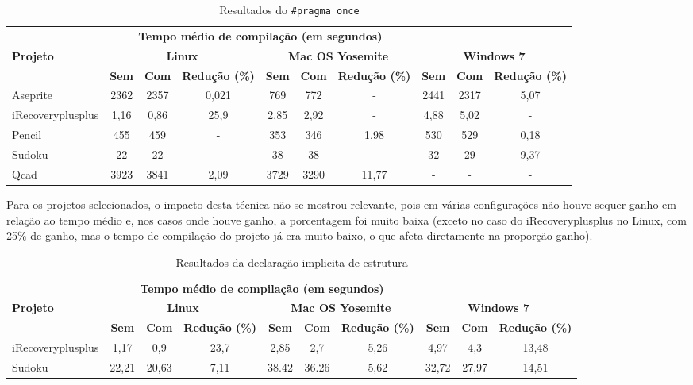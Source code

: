 \begin{table}[!ht]
\tiny
\centering
\caption{Resultados do \texttt{\#pragma once}}
\label{tab:pragma}
\begin{tabular}{lccccccccc}
& \multicolumn{6}{c}{\textbf{Tempo médio de compilação (em segundos)} } \\
\textbf{Projeto} & \multicolumn{3}{c}{\textbf{Linux}} & \multicolumn{3}{c}{\textbf{Mac OS Yosemite}} & \multicolumn{3}{c}{\textbf{Windows 7}} \\ 
& \textbf{Sem } & \textbf{Com }  & \textbf{Redução (\%)} & \textbf{Sem } & \textbf{Com }  & \textbf{Redução (\%)} & \textbf{Sem } & \textbf{Com }  & \textbf{Redução (\%)} \\
\toprule
Aseprite & 2362 &  2357 & 0,021     & 769  & 772 &   - &  2441 & 2317 & 5,07 \\
iRecoveryplusplus & 1,16 & 0,86     & 25,9 & 2,85 & 2,92 & - & 4,88     & 5,02 & - \\
Pencil & 455  &  459  &  - &  353   & 346  & 1,98 &  530      & 529 &  0,18 \\
Sudoku & 22   &  22   &  - &  38    & 38   & -  &  32 & 29 & 9,37 \\ 
Qcad   & 3923 &  3841 &  2,09  &  3729  & 3290 & 11,77   & - & -  & - \\ 
\end{tabular}
\end{table}

Para os projetos selecionados, o impacto desta técnica não se mostrou relevante, pois em várias configurações não houve sequer ganho em relação ao tempo médio e, nos casos onde
houve ganho, a porcentagem foi muito baixa (exceto no caso do iRecoveryplusplus no Linux, com 25\% de ganho, mas o tempo de compilação do projeto já era muito baixo, o que afeta diretamente na proporção ganho).

\begin{table}[!ht]
\tiny
\centering
\caption{Resultados da declaração implicita de estrutura}
\label{tab:forward_declaration}
\begin{tabular}{lccccccccc}
& \multicolumn{6}{c}{\textbf{Tempo médio de compilação (em segundos)} } \\
\textbf{Projeto} & \multicolumn{3}{c}{\textbf{Linux}} & \multicolumn{3}{c}{\textbf{Mac OS Yosemite}} & \multicolumn{3}{c}{\textbf{Windows 7}} \\ 
& \textbf{Sem } & \textbf{Com }  & \textbf{Redução (\%)} & \textbf{Sem } & \textbf{Com }  & \textbf{Redução (\%)} & \textbf{Sem } & \textbf{Com }  & \textbf{Redução (\%)} \\
\toprule
iRecoveryplusplus &   1,17  &   0,9  & 23,7 &   2,85 &  2,7 & 5,26 &  4,97 & 4,3 & 13,48 \\
Sudoku   & 22,21  & 20,63   & 7,11  &  38.42  & 36.26  & 5,62 & 32,72 & 27,97 & 14,51  \\ 
\end{tabular}
\end{table}

